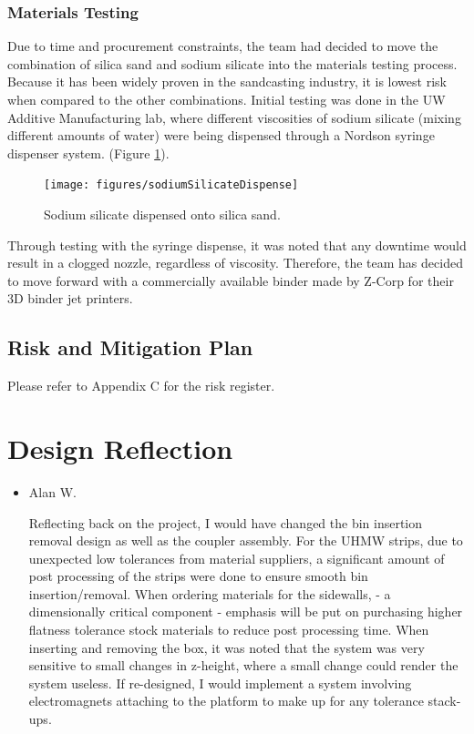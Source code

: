 \documentclass[11pt]{article}
\begin{document}
\subsubsection {Materials Testing}
Due to time and procurement constraints, the team had decided to move the combination of silica sand and sodium silicate into the materials testing process. Because it has been widely proven in the sandcasting industry, it is lowest risk when compared to the other combinations. Initial testing was done in the UW Additive Manufacturing lab, where different viscosities of sodium silicate (mixing different amounts of water) were being dispensed through a Nordson syringe dispenser system. (Figure \ref{sodiumSilicateDispense}).

\begin{figure}[htp]
\centering
\texttt{[image: figures/sodiumSilicateDispense]}
\caption{Sodium silicate dispensed onto silica sand.}
\label{sodiumSilicateDispense}
\end{figure}

Through testing with the syringe dispense, it was noted that any downtime would result in a clogged nozzle, regardless of viscosity. Therefore, the team has decided to move forward with a commercially available binder made by Z-Corp for their 3D binder jet printers. 

\newpage



\subsection{Risk and Mitigation Plan}
Please refer to Appendix C for the risk register.


\section{Design Reflection}
\begin{itemize}
\item Alan W.
	\begin{addmargin}[1em]{1em}
	Reflecting back on the project, I would have changed the bin insertion removal design as well as the coupler assembly. For the UHMW strips, due to unexpected low tolerances from material suppliers, a significant amount of post processing of the strips were done to ensure smooth bin insertion/removal. When ordering materials for the sidewalls, - a dimensionally critical component - emphasis will be put on purchasing higher flatness tolerance stock materials to reduce post processing time. 
When inserting and removing the box, it was noted that the system was very sensitive to small changes in z-height, where a small change could render the system useless. If re-designed, I would implement a system involving electromagnets attaching to the platform to make up for any tolerance stack-ups. 
	\end{addmargin}
\end{itemize}
\end{document}
